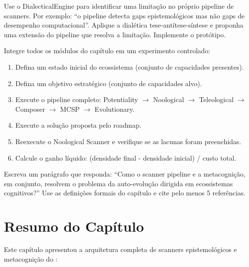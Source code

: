 \begin{exercicio}
Use o DialecticalEngine para identificar uma limitação no próprio pipeline
de scanners. Por exemplo: ``o pipeline detecta gaps epistemológicos mas
não gaps de desempenho computacional''. Aplique a dialética tese-antítese-síntese e proponha uma extensão do pipeline que resolva a limitação. Implemente o protótipo.
\end{exercicio}

\begin{exercicio}
Integre todos os módulos do capítulo em um experimento controlado:
\begin{enumerate}
\item Defina um estado inicial do ecossistema (conjunto de capacidades
presentes).
\item Defina um objetivo estratégico (conjunto de capacidades alvo).
\item Execute o pipeline completo: Potentiality $\rightarrow$ Noological
$\rightarrow$ Teleological $\rightarrow$ Composer $\rightarrow$ MCSP
$\rightarrow$ Evolutionary.
\item Execute a solução proposta pelo roadmap.
\item Reexecute o Noological Scanner e verifique se as lacunas foram
preenchidas.
\item Calcule o ganho líquido: (densidade final - densidade inicial) /
custo total.
\end{enumerate}
\end{exercicio}

\begin{exercicio}
Escreva um parágrafo que responda: ``Como o scanner pipeline e a
metacognição, em conjunto, resolvem o problema da auto-evolução
dirigida em ecossistemas cognitivos?'' Use as definições formais
do capítulo e cite pelo menos 5 referências.
\end{exercicio}

\section*{Resumo do Capítulo}

Este capítulo apresentou a arquitetura completa de scanners epistemológicos
e metacognição do \opencodeeco{}:

